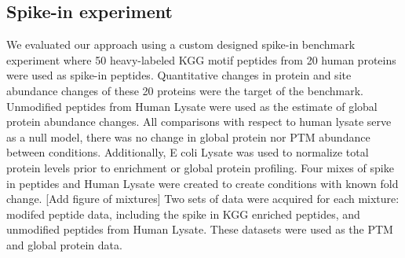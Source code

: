 \documentclass[mcp]{article}
\numberwithin{figure}{section} %
\numberwithin{table}{section}
\def\todo#1{{\color{red}[#1]}}
\begin{document}

\subsection*{Spike-in experiment}

We evaluated our approach using a custom designed spike-in benchmark experiment where 50 heavy-labeled KGG motif peptides from 20 human proteins were used as spike-in peptides. Quantitative changes in protein and site abundance changes of these 20 proteins were the target of the benchmark. Unmodified peptides from Human Lysate were used as the estimate of global protein abundance changes. All comparisons with respect to human lysate serve as a null model, there was no change in global protein nor PTM abundance between conditions. Additionally, E coli Lysate was used to normalize total protein levels prior to enrichment or global protein profiling. Four mixes of spike in peptides and Human Lysate were created to create conditions with known fold change. \todo{Add figure of mixtures} Two sets of data were acquired for each mixture: modifed peptide data, including the spike in KGG enriched peptides, and unmodified peptides from Human Lysate. These datasets were used as the PTM and global protein data.
\end{document}
